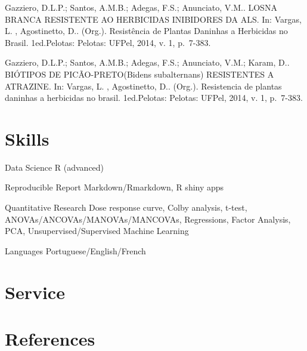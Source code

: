 \documentclass[11pt, a4paper]{awesome-cv}
\begin{document}
Gazziero, D.L.P.; Santos, A.M.B.; Adegas, F.S.; Anunciato, V.M.. LOSNA
BRANCA RESISTENTE AO HERBICIDAS INIBIDORES DA ALS. In: Vargas, L. ,
Agostinetto, D.. (Org.). Resistência de Plantas Daninhas a Herbicidas no
Brasil. 1ed.Pelotas: Pelotas: UFPel, 2014, v. 1, p.~7-383.

Gazziero, D.L.P.; Santos, A.M.B.; Adegas, F.S.; Anunciato, V.M.; Karam,
D.. BIÓTIPOS DE PICÃO-PRETO(Bidens subalternans) RESISTENTES A ATRAZINE.
In: Vargas, L. , Agostinetto, D.. (Org.). Resistencia de plantas
daninhas a herbicidas no brasil. 1ed.Pelotas: Pelotas: UFPel, 2014, v.
1, p.~7-383.

\pagebreak

\hypertarget{skills}{%
\section{Skills}\label{skills}}

\begin{cvskills}
  \cvskill
    {Data Science}
    {R (advanced)}

  \cvskill
    {Reproducible Report}
    {Markdown/Rmarkdown, R shiny apps}

  \cvskill
    {Quantitative Research}
    {Dose response curve, Colby analysis, t-test, ANOVAs/ANCOVAs/MANOVAs/MANCOVAs,\newline
    Regressions, Factor Analysis, PCA, Unsupervised/Supervised Machine Learning}

  \cvskill
    {Languages}
    {Portuguese/English/French}
\end{cvskills}

\hypertarget{service}{%
\section{Service}\label{service}}

\begin{cventries}
\end{cventries}

\hypertarget{references}{%
\section{References}\label{references}}
\end{document}
